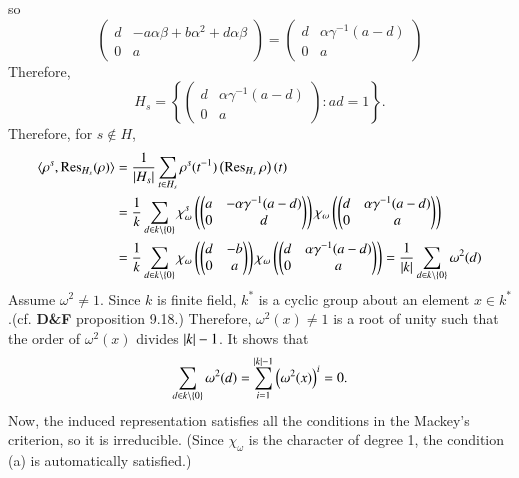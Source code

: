 \documentclass[a4paper, 12pt]{article}
\theoremstyle{Mydefinition}
\theoremstyle{Mytheorem}
\begin{document}
so
\begin{equation}
    \begin{pmatrix}
    d & -a\alpha\beta + b\alpha^2+d\alpha\beta\\
    0 & a
    \end{pmatrix} = \begin{pmatrix}
    d & \alpha\gamma^{-1}(a-d)\\
    0 & a
    \end{pmatrix}
\end{equation}
Therefore, 
\begin{equation}
    H_s = \left\{\begin{pmatrix}
    d & \alpha\gamma^{-1}(a-d) \\ 0 & a
    \end{pmatrix}:ad=1\right\}.
\end{equation}
Therefore, for $s\not\in H$,
\begin{equation}
\begin{split}
    \langle \rho^s, \Res_{H_s}(\rho) \rangle &= \frac{1}{\abs{H_s}}\sum_{t\in H_s}\rho^s(t^{-1})\left(\Res_{H_s}\rho\right)(t) \\
    &=\frac{1}{k}\sum_{d\in k\setminus\{0\}}\chi_\omega^s\left(\begin{pmatrix}
    a & -\alpha\gamma^{-1}(a-d)\\ 0 & d
    \end{pmatrix}\right)\chi_\omega\left(\begin{pmatrix}
    d & \alpha\gamma^{-1}(a-d) \\ 0 & a
    \end{pmatrix}\right)\\
    &=\frac{1}{k}\sum_{d\in k\setminus\{0\}}\chi_\omega\left(\begin{pmatrix}
    d & -b\\ 0 & a
    \end{pmatrix}\right)\chi_\omega\left(\begin{pmatrix}
    d & \alpha\gamma^{-1}(a-d) \\ 0 & a
    \end{pmatrix}\right) = \frac{1}{\abs{k}}\sum_{d\in k\setminus\{0\}}\omega^2(d)
\end{split} 
\end{equation}
Assume $\omega^2\neq 1$. Since $k$ is finite field, $k^*$ is a cyclic group about an element $x\in k^*$.(cf. \textbf{D\&F} proposition 9.18.) Therefore, $\omega^2(x)\neq 1$ is a root of unity such that the order of $\omega^2(x)$ divides $\abs{k}-1$. It shows that
\begin{equation}
    \sum_{d\in k\setminus\{0\}}\omega^2(d) = \sum_{i=1}^{\abs{k}-1}\left(\omega^2(x)\right)^i = 0.
\end{equation}
Now, the induced representation satisfies all the conditions in the Mackey's criterion, so it is irreducible. (Since $\chi_\omega$ is the character of degree 1, the condition (a) is automatically satisfied.)
\end{document}
